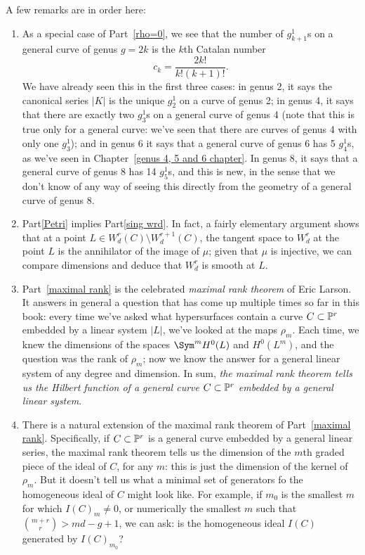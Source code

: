 A few remarks are in order here:
\begin{enumerate}

\item As a special case of Part~\ref{rho=0}, we see that the number of $g^1_{k+1}$s on a general curve of genus $g = 2k$ is the $k$th Catalan number 
$$
c_k = \frac{2k!}{k!(k+1)!}.
$$
We have already seen this in the first three cases: in genus 2, it says the canonical series $|K|$ is the unique $g^1_2$ on a curve of genus 2; in genus 4, it says that there are exactly two $g^1_3$s on a general curve of genus 4 (note that this is true only for a general curve: we've seen that there are curves of genus 4 with only one $g^1_3$); and in genus 6 it says that a general curve of genus 6 has 5 $g^1_4$s, as we've seen in Chapter~\ref{genus 4, 5 and 6 chapter}.  In genus 8, it says that a general curve of genus 8 has 14 $g^1_5$s, and this is new, in the sense that we don't know of any way of seeing this directly from the geometry of a general curve of genus 8.

\item Part\ref{Petri} implies Part\ref{sing wrd}. In fact, a fairly elementary argument shows that at a point $L \in W^r_d(C) \setminus W^{r+1}_d(C)$, the tangent space to $W^r_d$ at the point $L$ is the annihilator of the image of $\mu$; given that $\mu$ is injective, we can compare dimensions and deduce that $W^r_d$ is smooth at $L$.

\item Part~\ref{maximal rank} is the celebrated \emph{maximal rank theorem} of Eric Larson. It answers in general a question that has come up multiple times so far in this book: every time we've asked what hypersurfaces contain a curve $C \subset \PP^r$ embedded by a linear system $|L|$, we've looked at the maps $\rho_m$. Each time, we knew the dimensions of the spaces $\Sym^m H^0(L)$ and $H^0(L^m)$, and the question was the rank of $\rho_m$; now we know the answer for a general linear system of any degree and dimension. In sum, \emph{the maximal rank theorem tells us the Hilbert function of a general curve $C \subset \PP^r$ embedded by a general linear system}.

\item There is a natural extension of the maximal rank theorem of Part~\ref{maximal rank}. Specifically, if $C \subset \PP^r$ is a general curve embedded by a general linear series, the maximal rank theorem tells us the dimension of the $m$th graded piece of the ideal of $C$, for any $m$: this is just the dimension of the kernel of $\rho_m$. But it doesn't tell us what a minimal set of generators fo the homogeneous ideal of $C$ might look like. For example, if $m_0$ is the smallest $m$ for which $I(C)_m \neq 0$, or numerically the smallest $m$ such that $\binom{m+r}{r} > md-g+1$, we can ask: is the homogeneous ideal $I(C)$ generated by $I(C)_{m_0}$?


\end{enumerate}
